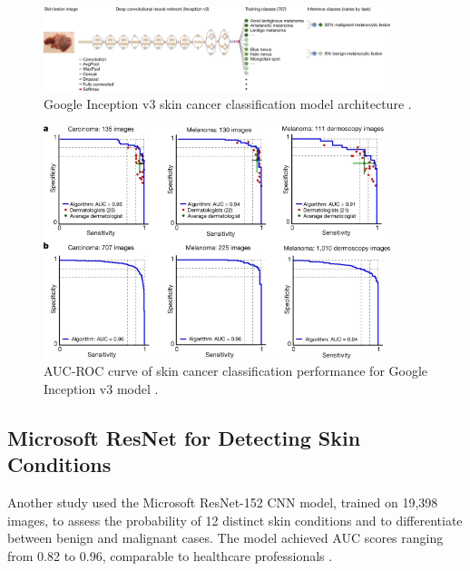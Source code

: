 \documentclass{article} %
\begin{document}
\begin{figure}[h]
\begin{center}
\includegraphics[width=0.9\textwidth]{Figs/inceptionv3.png}
\end{center}
\caption{Google Inception v3 skin cancer classification model architecture \citep{esteva2017dermatologist}.}
\end{figure}

\clearpage

\begin{figure}[h]
\begin{center}
\includegraphics[width=0.9\textwidth]{Figs/auc_roc_inception.png}
\end{center}
\caption{AUC-ROC curve of skin cancer classification performance for Google Inception v3 model \citep{esteva2017dermatologist}.}
\end{figure}

\subsection{Microsoft ResNet for Detecting Skin Conditions}

Another study used the Microsoft ResNet-152 CNN model, trained on 19,398 images, to assess the probability of 12 distinct skin conditions and to differentiate between benign and malignant cases. The model achieved AUC scores ranging from 0.82 to 0.96, comparable to healthcare professionals \citep{han2018classification}.
\end{document}
